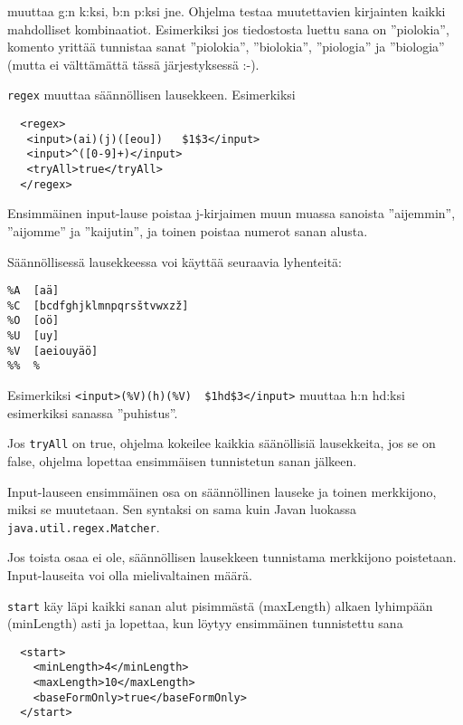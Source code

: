 \documentclass[12pt]{article}
\begin{document}
muuttaa g:n k:ksi, b:n p:ksi jne. Ohjelma testaa muutettavien
kirjainten kaikki mahdolliset kombinaatiot. Esimerkiksi jos
tiedostosta luettu sana on ''piolokia'', komento yrittää tunnistaa
sanat ''piolokia'', ''biolokia'', ''piologia'' ja ''biologia'' (mutta
ei välttämättä tässä järjestyksessä :-).




\verb|regex| muuttaa säännöllisen lausekkeen. Esimerkiksi

\begin{verbatim}
  <regex>
   <input>(ai)(j)([eou])   $1$3</input>
   <input>^([0-9]+)</input>
   <tryAll>true</tryAll>
  </regex>
\end{verbatim}

Ensimmäinen input-lause poistaa j-kirjaimen muun muassa sanoista
''aijemmin'', ''aijomme'' ja ''kaijutin'', ja toinen poistaa numerot
sanan alusta.


Säännöllisessä lausekkeessa voi käyttää seuraavia lyhenteitä:

\begin{verbatim}
%A  [aä]
%C  [bcdfghjklmnpqrsštvwxzž]
%O  [oö]
%U  [uy]
%V  [aeiouyäö]
%%  %
\end{verbatim}

Esimerkiksi \verb=<input>(%V)(h)(%V)  $1hd$3</input>=
muuttaa h:n hd:ksi esimerkiksi sanassa ''puhistus''.


Jos \verb=tryAll= on true, ohjelma kokeilee kaikkia säänöllisiä
lausekkeita, jos se on false, ohjelma lopettaa ensimmäisen tunnistetun
sanan jälkeen.

Input-lauseen ensimmäinen osa on säännöllinen lauseke ja toinen
merkkijono, miksi se muutetaan. Sen syntaksi on sama kuin Javan
luokassa \verb=java.util.regex.Matcher=.

Jos toista osaa ei ole, säännöllisen lausekkeen tunnistama merkkijono
poistetaan. Input-lauseita voi olla mielivaltainen määrä.




\bigskip
\verb=start= käy läpi kaikki sanan alut pisimmästä (maxLength) alkaen
lyhimpään (minLength) asti ja lopettaa, kun löytyy ensimmäinen
tunnistettu sana

\begin{verbatim}
  <start>
    <minLength>4</minLength>
    <maxLength>10</maxLength>
    <baseFormOnly>true</baseFormOnly>
  </start>
\end{verbatim}
\end{document}
